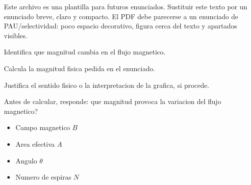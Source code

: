 \documentclass[11pt,a4paper]{article}
\begin{document}


Este archivo es una plantilla para futuros enunciados. Sustituir este texto por un enunciado breve, claro y compacto. El PDF debe parecerse a un enunciado de PAU/selectividad: poco espacio decorativo, figura cerca del texto y apartados visibles.


\begin{exerciseParts}
  \item Identifica que magnitud cambia en el flujo magnetico.
  \item Calcula la magnitud fisica pedida en el enunciado.
  \item Justifica el sentido fisico o la interpretacion de la grafica, si procede.
\end{exerciseParts}


Antes de calcular, responde: que magnitud provoca la variacion del flujo magnetico?

\begin{itemize}
  \item Campo magnetico \(B\)
  \item Area efectiva \(A\)
  \item Angulo \(\theta\)
  \item Numero de espiras \(N\)
\end{itemize}
\end{document}
